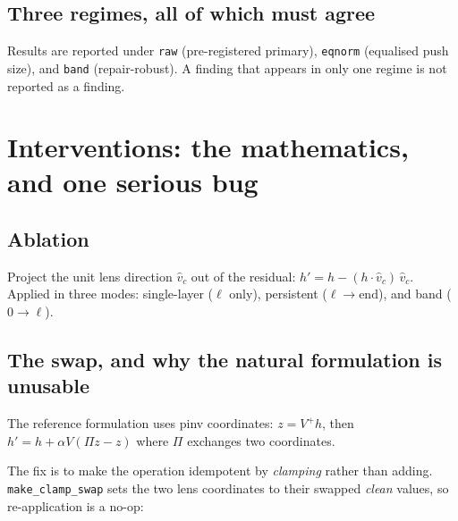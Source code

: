 \documentclass[11pt,a4paper]{article}
\begin{document}
\subsection{Three regimes, all of which must agree}

Results are reported under \texttt{raw} (pre-registered primary), \texttt{eqnorm}
(equalised push size), and \texttt{band} (repair-robust). A finding that appears in
only one regime is not reported as a finding.

\section{Interventions: the mathematics, and one serious bug}

\subsection{Ablation}

Project the unit lens direction $\hat{v}_c$ out of the residual:
$h' = h - (h \cdot \hat{v}_c)\,\hat{v}_c$. Applied in three modes:
single-layer ($\ell$ only), persistent ($\ell \to \text{end}$), and band
($0 \to \ell$).

\subsection{The swap, and why the natural formulation is unusable}

The reference formulation uses pinv coordinates: $z = V^{+}h$, then
$h' = h + \alpha V(\Pi z - z)$ where $\Pi$ exchanges two coordinates.

\medskip
\noindent{}

\medskip
\noindent
The fix is to make the operation idempotent by \emph{clamping} rather than adding.
\texttt{make\_clamp\_swap} sets the two lens coordinates to their swapped \emph{clean}
values, so re-application is a no-op:
\end{document}
